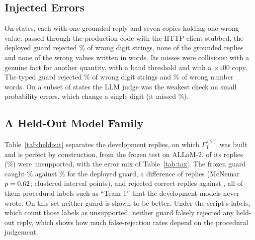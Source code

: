 \documentclass[conference]{IEEEtran}
\begin{document}
\subsection{Injected Errors}
On \GuardCtx{} states, each with one grounded reply and seven copies holding one wrong value, passed through the production code with the HTTP client stubbed, the deployed guard rejected \GAllDeployed\% of wrong digit strings, none of the grounded replies and none of the wrong values written in words. Its \GMissN{} misses were collisions: \GMissFact{} with a genuine fact for another quantity, \GMissRule{} with a band threshold and \GMissScale{} with a $\times100$ copy. The typed guard rejected \GAllTyped\% of wrong digit strings and \GWordsTyped\% of wrong number words. On a subset of \JudgeInjStates{} states the LLM judge was the weakest check on small probability errors, which change a single digit (it missed \JudgeProbSmallMiss\%).

\subsection{A Held-Out Model Family}
\label{sec:heldout}
Table~\ref{tab:heldout} separates the development replies, on which $\Gamma_{\mathrm{T}}^{(2)}$ was built and is perfect by construction, from the frozen test on ALLaM-2. \HoUnsup{} of its \HoN{} replies (\HoUnsupPct\%) were unsupported, with the error mix of Table~\ref{tab:tax}. The frozen guard caught \HoVtwoRec\% against \HoDepRec\% for the deployed guard, a difference of \HoDiffW{} replies (McNemar $p=0.62$; clustered interval \HoVtwoDepRecDiffCi{} points), and rejected \HoVtwoFp{} correct replies against \HoDepFp, all of them procedural labels such as ``Team 1'' that the development models never wrote. On this set neither guard is shown to be better. Under the script's labels, which count those labels as unsupported, neither guard falsely rejected any held-out reply, which shows how much false-rejection rates depend on the procedural judgement.
\end{document}
